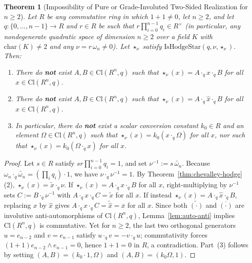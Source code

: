 \documentclass[11pt]{article}
\newtheorem{theorem}{Theorem}[section]
\theoremstyle{definition}
\newcommand{\Cl}{\mathrm{Cl}}
\begin{document}
\begin{theorem}[Impossibility of Pure or Grade-Involuted Two-Sided Realization for $n \ge 2$]\label{thm:no-two-sided}
Let $R$ be any commutative ring in which $1 + 1 \neq 0$, let $n \ge 2$, and let $q : \{0,\dots,n-1\} \to R$ and $r \in R$ be such that $r \prod_{i=0}^{n-1} q_i \in R^\times$ (in particular, any nondegenerate quadratic space of dimension $n \ge 2$ over a field $K$ with $\mathrm{char}(K) \neq 2$ and any $\nu = r\,\omega_n \neq 0$). Let $\star_\nu$ satisfy $\mathrm{IsHodgeStar}(q, \nu, \star_\nu)$. Then:
\begin{enumerate}
  \item[(1)] There do \textbf{not} exist $A, B \in \Cl(R^n, q)$ such that $\star_\nu(x) = A\cdot_q x\cdot_q B$ for all $x \in \Cl(R^n, q)$.
  \item[(2)] There do \textbf{not} exist $A, B \in \Cl(R^n, q)$ such that $\star_\nu(x) = A\cdot_q \hat{x}\cdot_q B$ for all $x \in \Cl(R^n, q)$.
  \item[(3)] In particular, there do \textbf{not} exist a scalar conversion constant $k_0 \in R$ and an element $\Omega \in \Cl(R^n, q)$ such that $\star_\nu(x) = k_0(x\cdot_q \Omega)$ for all $x$, nor such that $\star_\nu(x) = k_0(\Omega\cdot_q x)$ for all $x$.
\end{enumerate}
\end{theorem}
\begin{proof}
Let $s \in R$ satisfy $s r \prod_{i=0}^{n-1} q_i = 1$, and set $\nu^{-1} := s\,\widetilde{\omega_n}$. Because $\omega_n \cdot_q \widetilde{\omega_n} = (\prod_i q_i)\cdot 1$, we have $\nu \cdot_q \nu^{-1} = 1$. By Theorem~\ref{thm:chevalley-hodge}(2), $\star_\nu(x) = \widetilde{x}\cdot_q \nu$.
If $\star_\nu(x) = A\cdot_q x\cdot_q B$ for all $x$, right-multiplying by $\nu^{-1}$ sets $C := B\cdot_q \nu^{-1}$ with $A\cdot_q x\cdot_q C = \widetilde{x}$ for all $x$. If instead $\star_\nu(x) = A\cdot_q \hat{x}\cdot_q B$, replacing $x$ by $\hat{x}$ gives $A\cdot_q x\cdot_q C = \widetilde{\hat{x}} = \overline{x}$ for all $x$. Since both $\widetilde{(\cdot)}$ and $\overline{(\cdot)}$ are involutive anti-automorphisms of $\Cl(R^n,q)$, Lemma~\ref{lem:auto-anti} implies $\Cl(R^n,q)$ is commutative. Yet for $n \ge 2$, the last two orthogonal generators $u = e_{n-2}$ and $v = e_{n-1}$ satisfy $u\cdot_q v = -v\cdot_q u$; commutativity forces $(1+1)e_{n-2}\wedge e_{n-1} = 0$, hence $1 + 1 = 0$ in $R$, a contradiction. Part~(3) follows by setting $(A,B) = (k_0\cdot 1, \Omega)$ and $(A,B) = (k_0\Omega, 1)$.
\end{proof}
\end{document}
